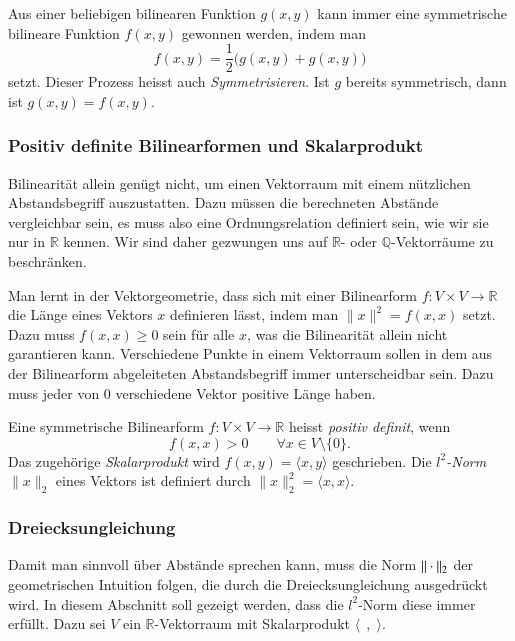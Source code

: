 Aus einer beliebigen bilinearen Funktion $g(x,y)$ kann immer eine
symmetrische bilineare Funktion $f(x,y)$ gewonnen werden, indem
man 
\[
f(x,y) = \frac12 \bigl(g(x,y)+g(x,y)\bigr)
\]
setzt.
Dieser Prozess heisst auch {\em Symmetrisieren}.
%
Ist $g$ bereits symmetrisch, dann ist $g(x,y)=f(x,y)$.

\subsubsection{Positiv definite Bilinearformen und Skalarprodukt}
Bilinearität allein genügt nicht, um einen Vektorraum mit einem
nützlichen Abstandsbegriff auszustatten.
Dazu müssen die berechneten Abstände vergleichbar sein, es muss also
eine Ordnungsrelation definiert sein, wie wir sie nur in $\mathbb{R}$
kennen.
Wir sind daher gezwungen uns auf $\mathbb{R}$- oder
$\mathbb{Q}$-Vektorräume zu beschränken.

Man lernt in der Vektorgeometrie, dass sich mit einer Bilinearform
$f\colon V\times V\to\mathbb{R}$ 
die Länge eines Vektors $x$ definieren lässt, indem man $\|x\|^2 = f(x,x)$
setzt.
Dazu muss $f(x,x)\ge 0$ sein für alle $x$, was die Bilinearität
allein nicht garantieren kann.
Verschiedene Punkte in einem Vektorraum sollen in dem aus der Bilinearform
abgeleiteten Abstandsbegriff immer unterscheidbar sein.
Dazu muss jeder von $0$ verschiedene Vektor positive Länge haben.

\begin{definition}
Eine symmetrische Bilinearform $f\colon V\times V\to\mathbb{R}$
heisst {\em positiv definit}, wenn
%
\[
f(x,x) > 0\qquad\forall x\in V\setminus\{0\}.
\]
Das zugehörige {\em Skalarprodukt} wird $f(x,y)=\langle x,y\rangle$
geschrieben.
%
Die {\em $l^2$-Norm} $\|x\|_2$ eines Vektors ist definiert durch
$\|x\|_2^2 = \langle x,x\rangle$.
%
\end{definition}

\subsubsection{Dreiecksungleichung}
Damit man sinnvoll über Abstände sprechen kann, muss die Norm
$\|\mathstrut\cdot\mathstrut\|_2$
der geometrischen Intuition folgen, die durch
die Dreiecksungleichung ausgedrückt wird.
In diesem Abschnitt soll gezeigt werden, dass die $l^2$-Norm
diese immer erfüllt.
Dazu sei $V$ ein $\mathbb{R}$-Vektorraum mit Skalarprodukt
$\langle\;\,,\;\rangle$.

